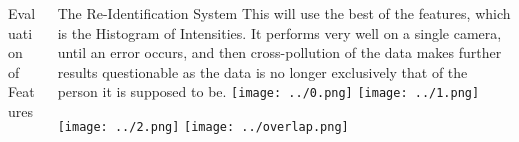 \documentclass[final]{beamer}
\begin{document}
\begin{frame}{}
\begin{columns}[t]
\begin{column}{.49\linewidth}
\begin{block}{Evaluation of Features}
        \end{block}
	 \end{column}
	 \begin{column}{.49\linewidth}
 		\begin{block}{The Re-Identification System}
 		This will use the best of the features, which is the Histogram of Intensities. It performs very well on a single camera, until an error occurs, and then cross-pollution of the data makes further results questionable as the data is no longer exclusively that of the person it is supposed to be. 
 		\texttt{[image: ../0.png]}  
        \texttt{[image: ../1.png]}  
        
        \texttt{[image: ../2.png]}
        \texttt{[image: ../overlap.png]}  

         

        \end{block}

      \end{column}
    \end{columns}
    

  \end{frame}
\end{document}
